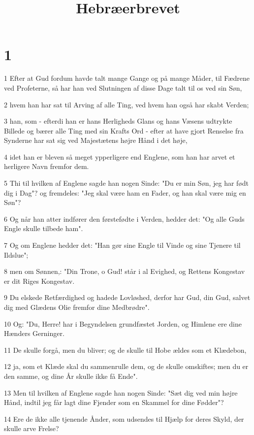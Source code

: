

\title{Hebræerbrevet}


\chapter{1}

\par 1 Efter at Gud fordum havde talt mange Gange og på mange Måder, til Fædrene ved Profeterne, så har han ved Slutningen af disse Dage talt til os ved sin Søn,
\par 2 hvem han har sat til Arving af alle Ting, ved hvem han også har skabt Verden;
\par 3 han, som - efterdi han er hans Herligheds Glans og hans Væsens udtrykte Billede og bærer alle Ting med sin Krafts Ord - efter at have gjort Renselse fra Synderne har sat sig ved Majestætens højre Hånd i det høje,
\par 4 idet han er bleven så meget ypperligere end Englene, som han har arvet et herligere Navn fremfor dem.
\par 5 Thi til hvilken af Englene sagde han nogen Sinde: "Du er min Søn, jeg har født dig i Dag"? og fremdeles: "Jeg skal være ham en Fader, og han skal være mig en Søn"?
\par 6 Og når han atter indfører den førstefødte i Verden, hedder det: "Og alle Guds Engle skulle tilbede ham".
\par 7 Og om Englene hedder det: "Han gør sine Engle til Vinde og sine Tjenere til Ildslue";
\par 8 men om Sønnen,: "Din Trone, o Gud! står i al Evighed, og Rettens Kongestav er dit Riges Kongestav.
\par 9 Du elskede Retfærdighed og hadede Lovløshed, derfor har Gud, din Gud, salvet dig med Glædens Olie fremfor dine Medbrødre".
\par 10 Og: "Du, Herre! har i Begyndelsen grundfæstet Jorden, og Himlene ere dine Hænders Gerninger.
\par 11 De skulle forgå, men du bliver; og de skulle til Hobe ældes som et Klædebon,
\par 12 ja, som et Klæde skal du sammenrulle dem, og de skulle omskiftes; men du er den samme, og dine År skulle ikke få Ende".
\par 13 Men til hvilken af Englene sagde han nogen Sinde: "Sæt dig ved min højre Hånd, indtil jeg får lagt dine Fjender som en Skammel for dine Fødder"?
\par 14 Ere de ikke alle tjenende Ånder, som udsendes til Hjælp for deres Skyld, der skulle arve Frelse?

